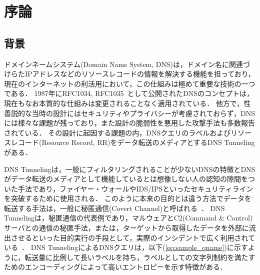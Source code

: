 \section{序論}
\subsection{背景}
ドメインネームシステム(Domain Name System, DNS)は，ドメイン名に関連づけらたIPアドレスなどのリソースレコードの情報を解決する機能を担っており，現在のインターネットの利活用において，この仕組みは極めて重要な技術の一つである．
1987年にRFC1034, RFC1035~\cite{rfc1034, rfc1035}として公開されたDNSのコンセプトは，現在もなお本質的な仕組みは変更されることなく適用されている．
他方で，性善説的な当時の設計にはセキュリティやプライバシーが考慮されておらず，DNSには様々な課題が残っており，また設計の脆弱性を悪用した攻撃手法も多数報告されている．
その設計に起因する課題の内，DNSクエリのラベルおよびリソースレコード(Resource Record, RR)をデータ転送のメディアとするDNS Tunnelingがある．

DNS Tunnelingは，一般にフィルタリングされることが少ないDNSの特徴とDNSがデータ転送のメディアとして機能しているとは想像しない人の認知の隙間をついた手法であり，ファイヤー・ウォールやIDS/IPSといったセキュリティラインを突破するために使用される．
このように本来の目的とは違う方法でデータを転送する手法は，一般に秘匿通信(Covert Channel)と呼ばれる~\cite{covertchannel}．
DNS Tunnelingは，秘匿通信の代表例であり，マルウェアとC2(Command \& Control)サーバとの通信の秘匿手法，または，ターゲットから取得したデータを外部に流出させるといった目的実行の手段として，実際のインシデントで広く利用されている~\cite{frameworkpos, bondupdater, bernhardpos, multigrainpos, pisloader, denis, dnsmessenger, udpos}．
DNS TunnelingによるDNSクエリは，以下(\ref{eq:sample_qname})に示すように，転送量に比例して長いラベルを持ち，ラベルとしての文字列制約を満たすためのエンコーディングによって高いエントロピーを示す特徴がある．

